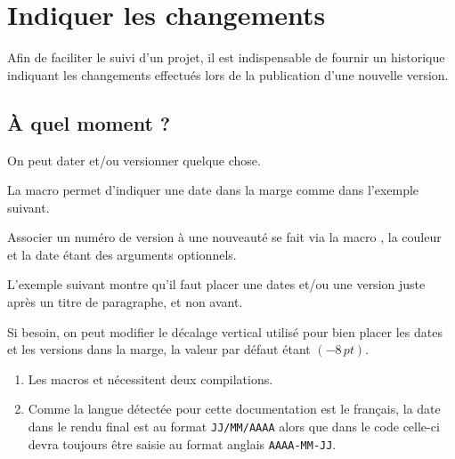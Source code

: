 \documentclass{../main/main}
\begin{document}
\section{Indiquer les changements}
\label{tutodoc-changes}

Afin de faciliter le suivi d'un projet, il est indispensable de fournir un historique indiquant les changements effectués lors de la publication d'une nouvelle version.



\subsection{À quel moment ?}

On peut dater et/ou versionner quelque chose.


\begin{tdocexa}
    La macro  permet d'indiquer une date dans la marge comme dans l'exemple suivant.

\end{tdocexa}


\begin{tdocexa}
    Associer un numéro de version à une nouveauté se fait via la macro , la couleur et la date étant des arguments optionnels.

\end{tdocexa}


\begin{tdocexa}
	L'exemple suivant montre qu'il faut placer une dates et/ou une version juste après un titre de paragraphe, et non avant.

\end{tdocexa}


\begin{tdocexa}
	Si besoin, on peut modifier le décalage vertical utilisé pour bien placer les dates et les versions dans la marge, la valeur par défaut étant $(-8\,\mathit{pt})$.

\end{tdocexa}


\begin{tdocimp}
    \begin{enumerate}[wide]
        \item Les macros  et  nécessitent deux compilations.

        \item Comme la langue détectée pour cette documentation est le français, la date dans le rendu final est au format \texttt{JJ/MM/AAAA} alors que dans le code celle-ci devra toujours être saisie au format anglais \texttt{AAAA-MM-JJ}.
    \end{enumerate}
\end{tdocimp}
\end{document}
